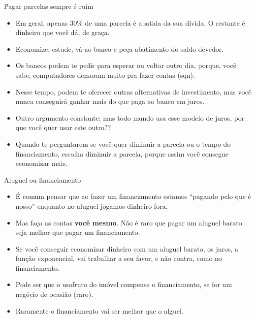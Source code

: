 \documentclass[]{beamer}
\begin{document}
\begin{frame}{Pagar parcelas sempre é ruim}

  \begin{itemize}
  \item Em geral, apenas $30\%$ de uma parcela é abatida da
    sua dívida. O restante é dinheiro que você dá, de graça.
    \pause
  \item Economize, estude, vá ao banco e peça abatimento do
    saldo devedor.
    \pause
    \item Os bancos podem te pedir para esperar ou voltar
      outro dia, porque, você sabe, computadores demoram
      muito pra fazer contas (sqn).
      \pause
    \item Nesse tempo, podem te oferecer outras alternativas
      de investimento, mas você nunca conseguirá ganhar mais
      do que paga ao banco em juros.
      \pause
    \item Outro argumento constante: mas todo mundo usa esse
      modelo de juros, por que você quer usar este outro??
      \pause
    \item Quando te perguntarem se você quer diminuir a
      parcela ou o tempo do financiamento, escolha diminuir
      a parcela, porque assim você consegue economizar mais.
  \end{itemize}

\end{frame}


\begin{frame}{Aluguel ou financiamento}

\begin{itemize}
\item É comum pensar que ao fazer um financiamento estamos
  ``pagando pelo que é nosso'' enquanto no aluguel jogamos
  dinheiro fora.
  \pause
\item Mas faça as contas \textbf{você mesmo}. Não é raro que
  pagar um aluguel barato seja melhor que pagar um
  financiamento.
\item Se você conseguir economizar dinheiro com um aluguel
  barato, os juros, a função exponencial, vai trabalhar a
  seu favor, e não contra, como no financiamento.
\item Pode ser que o usofruto do imóvel compense o
  financiamento, se for um negócio de ocasião (raro).
  \pause
\item Raramente o financiamento vai ser melhor que o alguel.
\end{itemize}
  
\end{frame}
\end{document}
